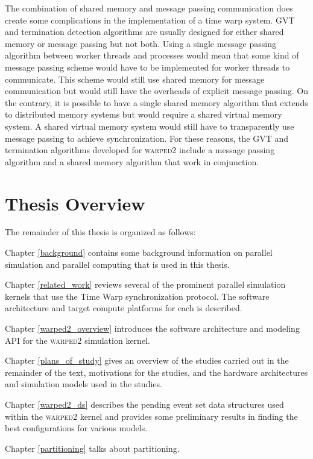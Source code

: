 \documentclass[11pt]{book}
\begin{document}
The combination of shared memory and message passing communication does create some
complications in the implementation of a time warp system. GVT and termination detection
algorithms are usually designed for either shared memory or message passing but not both.
Using a single message passing algorithm between worker threads and processes would mean
that some kind of message passing scheme would have to be implemented for worker threads
to communicate. This scheme would still use shared memory for message communication but
would still have the overheads of explicit message passing. On the contrary, it is possible
to have a single shared memory algorithm that extends to distributed memory systems but
would require a shared virtual memory system. A shared virtual memory system would still
have to transparently use message passing to achieve synchronization. For these reasons,
the GVT and termination algorithms developed for \textsc{warped2} include a message
passing algorithm and a shared memory algorithm that work in conjunction.

\section{Thesis Overview}

The remainder of this thesis is organized as follows:

Chapter \ref{background} contains some background information on parallel simulation and
parallel computing that is used in this thesis.

Chapter \ref{related_work} reviews several of the prominent parallel simulation kernels
that use the Time Warp synchronization protocol.  The software architecture and target
compute platforms for each is described.

Chapter \ref{warped2_overview} introduces the software architecture and modeling API for
the \textsc{warped2} simulation kernel.

Chapter \ref{plans_of_study} gives an overview of the studies carried out in the remainder
of the text, motivations for the studies, and the hardware architectures and simulation
models used in the studies.

Chapter \ref{warped2_ds} describes the pending event set data structures used within
the \textsc{warped2} kernel and provides some preliminary results in finding the best
configurations for various models.

Chapter \ref{partitioning} talks about partitioning.
\end{document}
